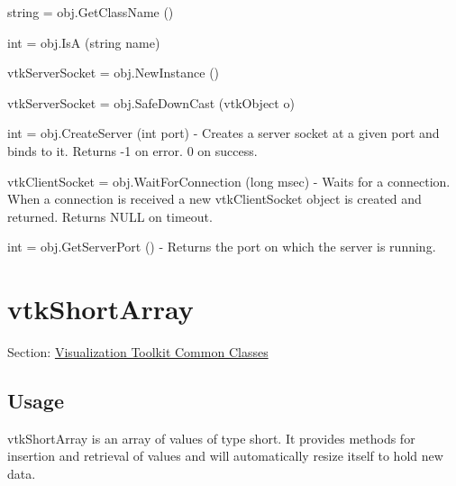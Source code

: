 \begin{DoxyItemize}
\item {\ttfamily string = obj.\-Get\-Class\-Name ()}  
\item {\ttfamily int = obj.\-Is\-A (string name)}  
\item {\ttfamily vtk\-Server\-Socket = obj.\-New\-Instance ()}  
\item {\ttfamily vtk\-Server\-Socket = obj.\-Safe\-Down\-Cast (vtk\-Object o)}  
\item {\ttfamily int = obj.\-Create\-Server (int port)} -\/ Creates a server socket at a given port and binds to it. Returns -\/1 on error. 0 on success.  
\item {\ttfamily vtk\-Client\-Socket = obj.\-Wait\-For\-Connection (long msec)} -\/ Waits for a connection. When a connection is received a new vtk\-Client\-Socket object is created and returned. Returns N\-U\-L\-L on timeout.  
\item {\ttfamily int = obj.\-Get\-Server\-Port ()} -\/ Returns the port on which the server is running.  
\end{DoxyItemize}\hypertarget{vtkcommon_vtkshortarray}{}\section{vtk\-Short\-Array}\label{vtkcommon_vtkshortarray}
Section\-: \hyperlink{sec_vtkcommon}{Visualization Toolkit Common Classes} \hypertarget{vtkwidgets_vtkxyplotwidget_Usage}{}\subsection{Usage}\label{vtkwidgets_vtkxyplotwidget_Usage}
vtk\-Short\-Array is an array of values of type short. It provides methods for insertion and retrieval of values and will automatically resize itself to hold new data.

